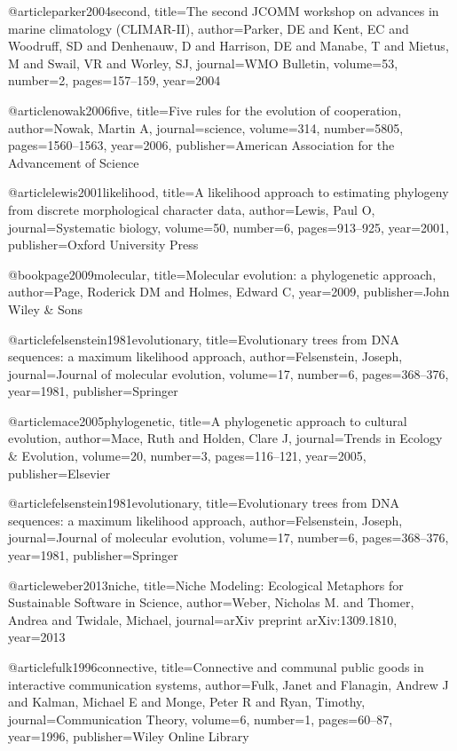 @article{parker2004second,
  title={The second JCOMM workshop on advances in marine climatology (CLIMAR-II)},
  author={Parker, DE and Kent, EC and Woodruff, SD and Denhenauw, D and Harrison, DE and Manabe, T and Mietus, M and Swail, VR and Worley, SJ},
  journal={WMO Bulletin},
  volume={53},
  number={2},
  pages={157--159},
  year={2004}
}


@article{nowak2006five,
  title={Five rules for the evolution of cooperation},
  author={Nowak, Martin A},
  journal={science},
  volume={314},
  number={5805},
  pages={1560--1563},
  year={2006},
  publisher={American Association for the Advancement of Science}
}


@article{lewis2001likelihood,
  title={A likelihood approach to estimating phylogeny from discrete morphological character data},
  author={Lewis, Paul O},
  journal={Systematic biology},
  volume={50},
  number={6},
  pages={913--925},
  year={2001},
  publisher={Oxford University Press}
}


@book{page2009molecular,
  title={Molecular evolution: a phylogenetic approach},
  author={Page, Roderick DM and Holmes, Edward C},
  year={2009},
  publisher={John Wiley \& Sons}
}

@article{felsenstein1981evolutionary,
  title={Evolutionary trees from DNA sequences: a maximum likelihood approach},
  author={Felsenstein, Joseph},
  journal={Journal of molecular evolution},
  volume={17},
  number={6},
  pages={368--376},
  year={1981},
  publisher={Springer}
}


@article{mace2005phylogenetic,
  title={A phylogenetic approach to cultural evolution},
  author={Mace, Ruth and Holden, Clare J},
  journal={Trends in Ecology \& Evolution},
  volume={20},
  number={3},
  pages={116--121},
  year={2005},
  publisher={Elsevier}
}

@article{felsenstein1981evolutionary,
  title={Evolutionary trees from DNA sequences: a maximum likelihood approach},
  author={Felsenstein, Joseph},
  journal={Journal of molecular evolution},
  volume={17},
  number={6},
  pages={368--376},
  year={1981},
  publisher={Springer}
}


@article{weber2013niche,
  title={Niche Modeling: Ecological Metaphors for Sustainable Software in Science},
  author={Weber, Nicholas M. and Thomer, Andrea and Twidale, Michael},
  journal={arXiv preprint arXiv:1309.1810},
  year={2013}
}

@article{fulk1996connective,
  title={Connective and communal public goods in interactive communication systems},
  author={Fulk, Janet and Flanagin, Andrew J and Kalman, Michael E and Monge, Peter R and Ryan, Timothy},
  journal={Communication Theory},
  volume={6},
  number={1},
  pages={60--87},
  year={1996},
  publisher={Wiley Online Library}
}


